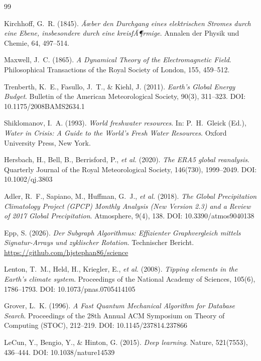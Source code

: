 ﻿\documentclass[a4paper,12pt]{article}
\theoremstyle{definition}
\begin{document}
\begin{thebibliography}{99}

Kirchhoff, G.~R. (1845).
\textit{Ãœber den Durchgang eines elektrischen Stromes durch eine Ebene,
insbesondere durch eine kreisfÃ¶rmige}.
Annalen der Physik und Chemie, 64, 497--514.

Maxwell, J.~C. (1865).
\textit{A Dynamical Theory of the Electromagnetic Field}.
Philosophical Transactions of the Royal Society of London, 155, 459--512.

Trenberth, K.~E., Fasullo, J.~T., \& Kiehl, J. (2011).
\textit{Earth's Global Energy Budget}.
Bulletin of the American Meteorological Society, 90(3), 311--323.
DOI: 10.1175/2008BAMS2634.1

Shiklomanov, I.~A. (1993).
\textit{World freshwater resources}.
In: P.~H.~Gleick (Ed.), \textit{Water in Crisis: A Guide to the World's
Fresh Water Resources}. Oxford University Press, New York.

Hersbach, H., Bell, B., Berrisford, P., \textit{et al.} (2020).
\textit{The ERA5 global reanalysis}.
Quarterly Journal of the Royal Meteorological Society, 146(730), 1999--2049.
DOI: 10.1002/qj.3803

Adler, R.~F., Sapiano, M., Huffman, G.~J., \textit{et al.} (2018).
\textit{The Global Precipitation Climatology Project (GPCP) Monthly
Analysis (New Version 2.3) and a Review of 2017 Global Precipitation}.
Atmosphere, 9(4), 138.
DOI: 10.3390/atmos9040138

Epp, S. (2026).
\textit{Der Subgraph Algorithmus: Effizienter Graphvergleich mittels
Signatur-Arrays und zyklischer Rotation}.
Technischer Bericht.
\url{https://github.com/hjstephan86/science}

Lenton, T.~M., Held, H., Kriegler, E., \textit{et al.} (2008).
\textit{Tipping elements in the Earth's climate system}.
Proceedings of the National Academy of Sciences, 105(6), 1786--1793.
DOI: 10.1073/pnas.0705414105

Grover, L.~K. (1996).
\textit{A Fast Quantum Mechanical Algorithm for Database Search}.
Proceedings of the 28th Annual ACM Symposium on Theory of Computing
(STOC), 212--219.
DOI: 10.1145/237814.237866

LeCun, Y., Bengio, Y., \& Hinton, G. (2015).
\textit{Deep learning}.
Nature, 521(7553), 436--444.
DOI: 10.1038/nature14539


\end{thebibliography}
\end{document}
